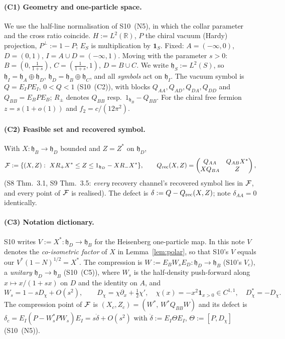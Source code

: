\documentclass[11pt]{article}
\newcommand{\hh}{\mathfrak h}
\begin{document}
\paragraph{(C1) Geometry and one-particle space.}
We use the half-line normalisation of S10~(N5), in which the collar parameter and the
cross ratio coincide.  $H:=L^2(\mathbb R)$, $P$ the chiral vacuum (Hardy) projection,
$P^\perp:=1-P$; $E_S$ is multiplication by $\mathbf 1_S$.  Fixed:
$A=(-\infty,0)$, $D=(0,1)$, $I=A\cup D=(-\infty,1)$.  Moving with the parameter $s>0$:
$B=(0,\tfrac1{1+s})$, $C=(\tfrac1{1+s},1)$, $D=B\cup C$.  We write
$\hh_S:=L^2(S)$, so $\hh_I=\hh_A\oplus\hh_D$, $\hh_D=\hh_B\oplus\hh_C$, and all
\emph{symbols} act on $\hh_I$.  The vacuum symbol is $Q=E_IPE_I$, $0<Q<1$ (S10~(C2)), with
blocks $Q_{AA},Q_{AD},Q_{DA},Q_{DD}$ and $Q_{BB}=E_BPE_B$; $R_\pm$ denotes $Q_{BB}$ resp.\
$1_{\hh_B}-Q_{BB}$.  For the chiral free fermion $z=s(1+o(1))$ and $f_2=c/(12\pi^2)$.

\paragraph{(C2) Feasible set and recovered symbol.}  With $X:\hh_B\to\hh_D$ bounded and
$Z=Z^*$ on $\hh_D$,
\begin{equation}\label{eq:F}
 \cF:=\{(X,Z):\ XR_+X^*\le Z\le 1_{\hh_D}-XR_-X^*\},\qquad
 Q_{\rm rec}(X,Z)=\begin{pmatrix}Q_{AA}&Q_{AB}X^*\\ XQ_{BA}&Z\end{pmatrix},
\end{equation}
(S8 Thm.~3.1, S9 Thm.~3.5: \emph{every} recovery channel's recovered symbol lies in $\mathcal F$,
and every point of $\mathcal F$ is realised).  The defect is $\delta:=Q-Q_{\rm rec}(X,Z)$; note
$\delta_{AA}=0$ identically.

\paragraph{(C3) Notation dictionary.}  S10 writes $V:=X^*:\hh_D\to\hh_B$ for the Heisenberg
one-particle map.  In this note $V$ denotes the \emph{co-isometric factor} of $X$ in
Lemma~\ref{lem:polar}, so that S10's $V$ equals our $V^*(1-N)^{1/2}=X^*$.  The compression
is $W:=E_BW_sE_D:\hh_D\to\hh_B$ (S10's $V_c$), a \emph{unitary} $\hh_D\to\hh_B$ (S10~(C5)),
where $W_s$ is the half-density push-forward along $x\mapsto x/(1+sx)$ on $D$ and the
identity on $A$, and
\begin{equation}\label{eq:Wexp}
 W_s=1-sD_\chi+O(s^2),\qquad D_\chi=\chi\partial_x+\tfrac12\chi',\quad
 \chi(x)=-x^2\mathbf 1_{x>0}\in C^{1,1},\quad D_\chi^*=-D_\chi .
\end{equation}
The compression point of $\mathcal F$ is $(X_c,Z_c)=(W^*,\,W^*Q_{BB}W)$ and its defect is
$\delta_c=E_I(P-W_s^*PW_s)E_I=s\dot\delta+O(s^2)$ with
$\dot\delta:=E_I\Theta E_I$, $\Theta:=[P,D_\chi]$ (S10~(N5)).
\end{document}
